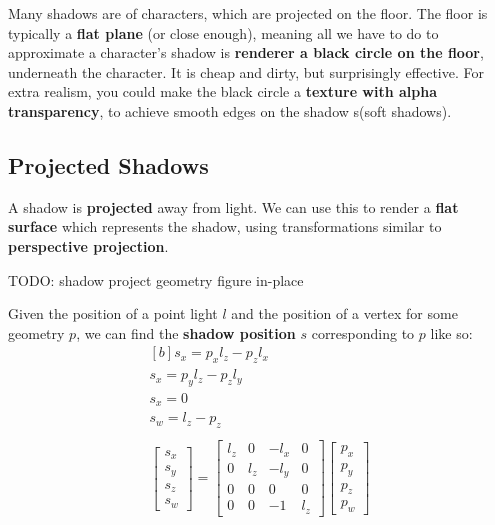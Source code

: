 \documentclass{article}
\begin{document}
Many shadows are of characters, which are projected on the floor. The floor is typically a \textbf{flat plane} (or close enough), meaning all we have to do to approximate a character's shadow is \textbf{renderer a black circle on the floor}, underneath the character. It is cheap and dirty, but surprisingly effective. For extra realism, you could make the black circle a \textbf{texture with alpha transparency}, to achieve smooth edges on the shadow s(soft shadows).

\subsection{Projected Shadows}

A shadow is \textbf{projected} away from light. We can use this to render a \textbf{flat surface} which represents the shadow, using transformations similar to \textbf{perspective projection}.

TODO: shadow project geometry figure in-place

Given the position of a point light $l$ and the position of a vertex for some geometry $p$, we can find the \textbf{shadow position} $s$ corresponding to $p$ like so:
\begin{equation}
\begin{aligned}[b]
	s_x = p_x l_z - p_z l_x \\
	s_x = p_y l_z - p_z l_y \\
	s_x = 0 \\
	s_w = l_z - p_z \\
	\\
	\left[ \begin{matrix}
	s_x \\ s_y \\ s_z \\ s_w
	\end{matrix} \right]
	= 
	\left[ \begin{matrix}
	l_z & 0 & -l_x & 0 \\
	0 & l_z & -l_y & 0 \\
	0 & 0 & 0 & 0 \\
	0 & 0 & -1 & l_z
	\end{matrix} \right]
	\left[ \begin{matrix}
	p_x \\ p_y \\ p_z \\ p_w
	\end{matrix} \right]
\end{aligned}
\label{eq:shadow-projection-derivation}
\end{equation}
\end{document}
